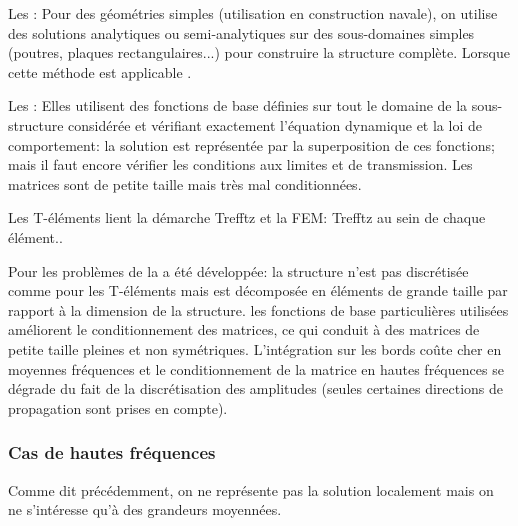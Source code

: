 \bigskip
Les :
Pour des géométries simples (utilisation en construction navale), on utilise des solutions
analytiques ou semi-analytiques sur des sous-domaines simples (poutres, plaques rectangulaires...)
pour construire la structure complète.
Lorsque cette méthode est applicable .

\bigskip
Les :
Elles utilisent des fonctions de base définies sur tout le domaine de la sous-structure considérée
et vérifiant exactement l'équation dynamique et la loi de comportement: la solution est représentée
par la superposition de ces fonctions; mais il faut encore vérifier les conditions aux limites et de
transmission.
Les matrices sont de petite taille mais très mal conditionnées.

Les T-éléments lient la démarche Trefftz et la FEM:
Trefftz au sein de chaque élément..

Pour les problèmes de  la 
a été développée:
la structure n'est pas discrétisée comme pour les T-éléments mais est décomposée en
éléments de grande taille par rapport à la dimension de la structure. les fonctions de base
particulières utilisées améliorent le conditionnement des matrices, ce qui conduit à des
matrices de petite taille pleines et non symétriques. L'intégration sur les bords coûte cher
en moyennes fréquences et le conditionnement de la matrice en hautes fréquences se dégrade du fait de la discrétisation des amplitudes
(seules certaines directions de propagation sont prises en compte).

\medskip
\subsubsection{Cas de hautes fréquences}
Comme dit précédemment, on ne représente pas la solution localement mais on ne
s'intéresse qu'à des grandeurs moyennées.

